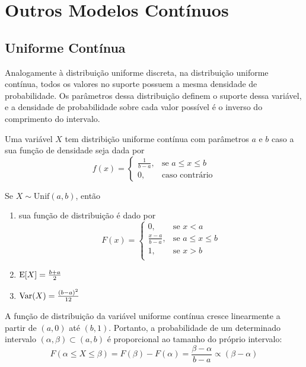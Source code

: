 \section{Outros Modelos Contínuos}

\subsection{Uniforme Contínua}

Analogamente à distribuição uniforme discreta, na distribuição uniforme contínua, todos
os valores no suporte possuem a mesma densidade de probabilidade.
Os parâmetros dessa distribuição definem o suporte dessa variável, e a densidade
de probabilidade sobre cada valor possível é o inverso do comprimento do intervalo.

\begin{def:uniforme continua}
Uma variável $X$ tem distribição uniforme contínua com parâmetros $a$ e $b$ caso a sua
função de densidade seja dada por
\[
    f(x) = \begin{cases}
    \frac{1}{b-a},&\text{se } a \le x \le b \\
    0,&\text{caso contrário}
    \end{cases}
\]
\end{def:uniforme continua}

\begin{prop:uniforme continua}
\label{prop:uniforme continua}
Se $X \sim \mathrm{Unif}(a, b)$, então
\begin{enumerate}
\item sua função de distribuição é dado por
\[
    F(x) = \begin{cases}
        0,&\text{se } x < a \\
        \frac{x - a}{b-a},&\text{se } a \le x \le b \\
        1,&\text{se } x > b \\
    \end{cases}
\]
\item $\mathrm{E}\!\left[X\right] = \frac{b + a}{2}$
\item $\mathrm{Var}\!\left(X\right) = \frac{(b-a)^2}{12}$
\end{enumerate}
\end{prop:uniforme continua}

\begin{obs:uniforme continua 1}
A função de distribuição da variável uniforme contínua cresce linearmente a partir de
$(a, 0)$ até $(b,1)$.
Portanto, a probabilidade de um determinado intervalo $(\alpha, \beta) \subset (a, b)$
é proporcional ao tamanho do próprio intervalo:
\[
    F(\alpha \leq X \leq \beta) = F(\beta) - F(\alpha) = \frac{\beta - \alpha}{b - a} \propto (\beta - \alpha)
\]
\end{obs:uniforme continua 1}

